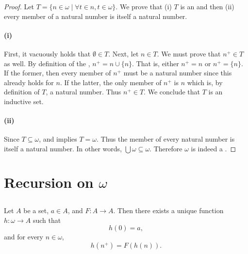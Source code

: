 \documentclass{report}
\begin{document}
\begin{proof}

  Let $T = \{n \in \omega \mid \forall t \in n, t \in \omega\}$.
  We prove that (i) $T$ is an  and then (ii) every
    member of a natural number is itself a natural number.

  \paragraph{(i)}%

    First, it vacuously holds that $\emptyset \in T$.
    Next, let $n \in T$.
    We must prove that $n^+ \in T$ as well.
    By definition of the , $n^+ = n \cup \{n\}$.
    That is, either $n^+ = n$ or $n^+ = \{n\}$.
    If the former, then every member of $n^+$ must be a natural number since
      this already holds for $n$.
    If the latter, the only member of $n^+$ is $n$ which is, by definition of
      $T$, a natural number.
    Thus $n^+ \in T$.
    We conclude that $T$ is an inductive set.

  \paragraph{(ii)}%

    Since $T \subseteq \omega$,  and
       implies $T = \omega$.
    Thus the member of every natural number is itself a natural number.
    In other words, $\bigcup \omega \subseteq \omega$.
    Therefore $\omega$ is indeed a .

\end{proof}

\section{Recursion on \texorpdfstring{$\omega$}{the Natural Numbers}}%

\subsection{}%

\begin{theorem}

  Let $A$ be a set, $a \in A$, and $F \colon A \rightarrow A$.
  Then there exists a unique function $h \colon \omega \rightarrow A$ such that
    $$h(0) = a,$$ and for every $n \in \omega$, $$h(n^+) = F(h(n)).$$

\end{theorem}
\end{document}
